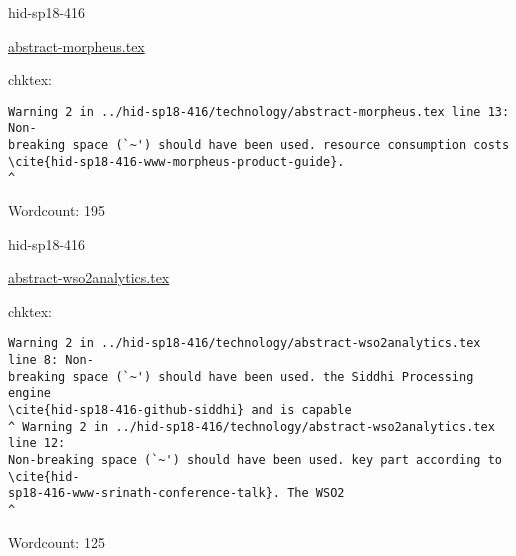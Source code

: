 

\begin{IU}

hid-sp18-416

\href{https://github.com/cloudmesh-community/hid-sp18-416/blob/master//technology/abstract-morpheus.tex}{abstract-morpheus.tex}

 
chktex:
\begin{tiny}
\begin{verbatim}
Warning 2 in ../hid-sp18-416/technology/abstract-morpheus.tex line 13: Non-
breaking space (`~') should have been used. resource consumption costs
\cite{hid-sp18-416-www-morpheus-product-guide}.                             ^
\end{verbatim}
\end{tiny}

Wordcount: 195

\end{IU}



\begin{IU}

hid-sp18-416

\href{https://github.com/cloudmesh-community/hid-sp18-416/blob/master//technology/abstract-wso2analytics.tex}{abstract-wso2analytics.tex}

 
chktex:
\begin{tiny}
\begin{verbatim}
Warning 2 in ../hid-sp18-416/technology/abstract-wso2analytics.tex line 8: Non-
breaking space (`~') should have been used. the Siddhi Processing engine
\cite{hid-sp18-416-github-siddhi} and is capable
^ Warning 2 in ../hid-sp18-416/technology/abstract-wso2analytics.tex line 12:
Non-breaking space (`~') should have been used. key part according to \cite{hid-
sp18-416-www-srinath-conference-talk}. The WSO2                         ^
\end{verbatim}
\end{tiny}

Wordcount: 125

\end{IU}



